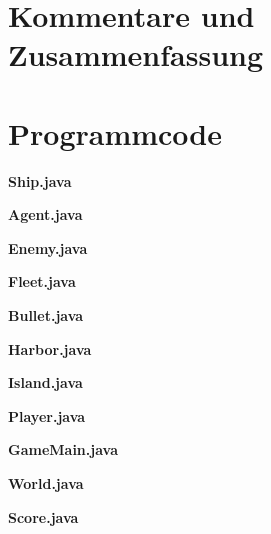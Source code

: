 \documentclass{article}
\begin{document}
\section{Kommentare und Zusammenfassung}

\newpage
\section{Programmcode}
\textbf{Ship.java}

\newpage
\textbf{Agent.java}

\newpage
\textbf{Enemy.java}

\newpage
\textbf{Fleet.java}

\newpage
\textbf{Bullet.java}

\newpage
\textbf{Harbor.java}

\newpage
\textbf{Island.java}

\newpage
\textbf{Player.java}

\newpage
\textbf{GameMain.java}

\newpage
\textbf{World.java}

\newpage
\textbf{Score.java}

\end{document}
